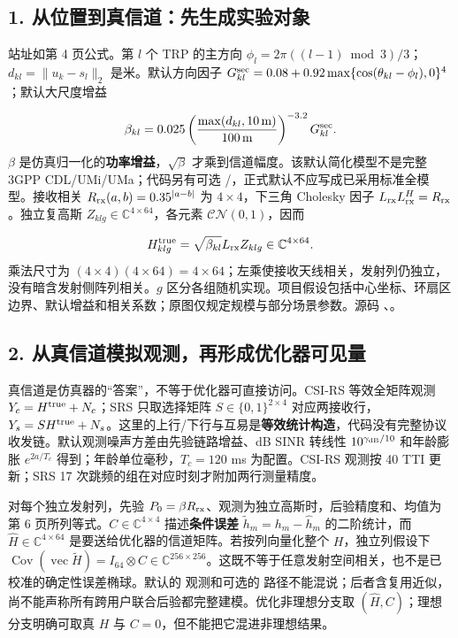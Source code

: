 \documentclass[11pt,a4paper]{ctexart}
\begin{document}
\subsection*{1. 从位置到真信道：先生成实验对象}

站址如第 4 页公式。第 $l$ 个 TRP 的主方向 $\phi_l=2\pi((l-1)\bmod3)/3$；$d_{kl}=\|u_k-s_l\|_2$ 是米。默认方向因子 $G_{kl}^{\rm sec}=0.08+0.92\max\{\cos(\theta_{kl}-\phi_l),0\}^4$；默认大尺度增益\par
\[
\beta_{kl}=0.025\left(\frac{\max(d_{kl},10\,\mathrm m)}{100\,\mathrm m}\right)^{-3.2}G_{kl}^{\rm sec}.
\]
$\beta$ 是仿真归一化的\textbf{功率增益}，$\sqrt\beta$ 才乘到信道幅度。该默认简化模型不是完整 3GPP CDL/UMi/UMa；代码另有可选 /，正式默认不应写成已采用标准全模型。接收相关 $R_{\rm rx}(a,b)=0.35^{|a-b|}$ 为 $4\times4$，下三角 Cholesky 因子 $L_{\rm rx}L_{\rm rx}^H=R_{\rm rx}$。独立复高斯 $Z_{klg}\in\mathbb C^{4\times64}$，各元素 $\mathcal{CN}(0,1)$，因而\par
\[
H^{\rm true}_{klg}=\sqrt{\beta_{kl}}L_{\rm rx}Z_{klg}\in\mathbb C^{4\times64}.
\]
乘法尺寸为 $(4\times4)(4\times64)=4\times64$；左乘使接收天线相关，发射列仍独立，没有暗含发射侧阵列相关。$g$ 区分各组随机实现。项目假设包括中心坐标、环扇区边界、默认增益和相关系数；原图仅规定规模与部分场景参数。源码 、。\par

\subsection*{2. 从真信道模拟观测，再形成优化器可见量}

真信道是仿真器的“答案”，不等于优化器可直接访问。CSI-RS 等效全矩阵观测 $Y_c=H^{\rm true}+N_c$；SRS 只取选择矩阵 $S\in\{0,1\}^{2\times4}$ 对应两接收行，$Y_s=SH^{\rm true}+N_s$。这里的上行/下行与互易是\textbf{等效统计构造}，代码没有完整协议收发链。默认观测噪声方差由先验链路增益、dB SINR 转线性 $10^{\gamma_{\rm dB}/10}$ 和年龄膨胀 $e^{2a/T_c}$ 得到；年龄单位毫秒，$T_c=120$ ms 为配置。CSI-RS 观测按 40 TTI 更新；SRS 17 次跳频的组在对应时刻才附加两行测量精度。\par

对每个独立发射列，先验 $P_0=\beta R_{\rm rx}$、观测为独立高斯时，后验精度和、均值为第 6 页所列等式。$C\in\mathbb C^{4\times4}$ 描述\textbf{条件误差} $\widetilde h_m=h_m-\widehat h_m$ 的二阶统计，而 $\widehat H\in\mathbb C^{4\times64}$ 是要送给优化器的信道矩阵。若按列向量化整个 $H$，独立列假设下 $\operatorname{Cov}(\operatorname{vec}\widetilde H)=I_{64}\otimes C\in\mathbb C^{256\times256}$。这既不等于任意发射空间相关，也不是已校准的确定性误差椭球。默认的  观测和可选的  路径不能混说；后者含复用近似，尚不能声称所有跨用户联合后验都完整建模。优化非理想分支取 $(\widehat H,C)$；理想分支明确可取真 $H$ 与 $C=0$，但不能把它混进非理想结果。\par
\end{document}
